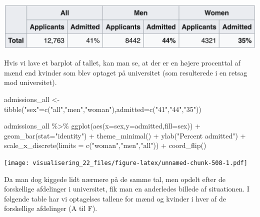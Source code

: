 \documentclass[
]{book}
\newenvironment{Shaded}{\begin{snugshade}}{\end{snugshade}}
\newcommand{\AttributeTok}[1]{\textcolor[rgb]{0.77,0.63,0.00}{#1}}
\newcommand{\FunctionTok}[1]{\textcolor[rgb]{0.00,0.00,0.00}{#1}}
\newcommand{\NormalTok}[1]{#1}
\newcommand{\OtherTok}[1]{\textcolor[rgb]{0.56,0.35,0.01}{#1}}
\newcommand{\SpecialCharTok}[1]{\textcolor[rgb]{0.00,0.00,0.00}{#1}}
\newcommand{\StringTok}[1]{\textcolor[rgb]{0.31,0.60,0.02}{#1}}
\begin{document}
\includegraphics[width=0.85\linewidth]{plots/admissions}

Hvis vi lave et barplot af tallet, kan man se, at der er en højere procenttal af mænd end kvinder som blev optaget på universitet (som resulterede i en retsag mod universitet).

\begin{Shaded}
\begin{Highlighting}[]
\NormalTok{admissions\_all }\OtherTok{\textless{}{-}} \FunctionTok{tibble}\NormalTok{(}\StringTok{"sex"}\OtherTok{=}\FunctionTok{c}\NormalTok{(}\StringTok{"all"}\NormalTok{,}\StringTok{"men"}\NormalTok{,}\StringTok{"woman"}\NormalTok{),}\AttributeTok{admitted=}\FunctionTok{c}\NormalTok{(}\StringTok{"41"}\NormalTok{,}\StringTok{"44"}\NormalTok{,}\StringTok{"35"}\NormalTok{))}

\NormalTok{admissions\_all }\SpecialCharTok{\%\textgreater{}\%} \FunctionTok{ggplot}\NormalTok{(}\FunctionTok{aes}\NormalTok{(}\AttributeTok{x=}\NormalTok{sex,}\AttributeTok{y=}\NormalTok{admitted,}\AttributeTok{fill=}\NormalTok{sex)) }\SpecialCharTok{+} 
  \FunctionTok{geom\_bar}\NormalTok{(}\AttributeTok{stat=}\StringTok{"identity"}\NormalTok{) }\SpecialCharTok{+} 
  \FunctionTok{theme\_minimal}\NormalTok{() }\SpecialCharTok{+} 
  \FunctionTok{ylab}\NormalTok{(}\StringTok{"Percent admitted"}\NormalTok{) }\SpecialCharTok{+}
  \FunctionTok{scale\_x\_discrete}\NormalTok{(}\AttributeTok{limits =} \FunctionTok{c}\NormalTok{(}\StringTok{"woman"}\NormalTok{,}\StringTok{"men"}\NormalTok{,}\StringTok{"all"}\NormalTok{)) }\SpecialCharTok{+}
  \FunctionTok{coord\_flip}\NormalTok{()}
\end{Highlighting}
\end{Shaded}

\texttt{[image: visualisering\_22\_files/figure-latex/unnamed-chunk-508-1.pdf]}

Da man dog kiggede lidt nærmere på de samme tal, men opdelt efter de forskellige afdelinger i universitet, fik man en anderledes billede af situationen. I følgende table har vi optagelses tallene for mænd og kvinder i hver af de forskellige afdelinger (A til F).
\end{document}
